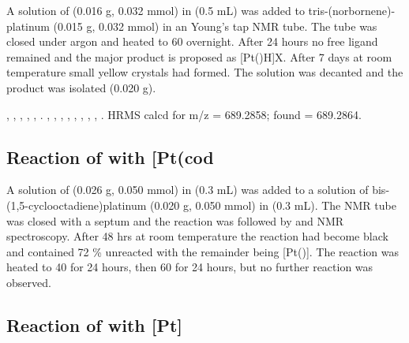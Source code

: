 
A solution of \tBuxantphos{} (0.016 g, 0.032 mmol) in  (0.5 mL) was added to tris-(norbornene)-platinum (0.015 g, 0.032 mmol) in an Young's tap NMR tube.  The tube was closed under argon and heated to 60 \degC{} overnight.  After 24 hours no free ligand remained and the major product is proposed as [Pt(\tBuxantphosk)H]X.  After 7 days at room temperature small yellow crystals had formed.  The solution was decanted and the product was isolated (0.020 g).  

,
,
,
,
,
.
,
,
,
,
,
,
,
,
.
HRMS calcd for  m/z = 689.2858; found = 689.2864.

\subsection*{Reaction of \tButhixantphos{} with \texorpdfstring{[Pt(cod\ce{)2]}} P}

A solution of \tButhixantphos{} (0.026 g, 0.050 mmol) in  (0.3 mL) was added to a solution of bis-(1,5-cyclooctadiene)platinum (0.020 g, 0.050 mmol) in  (0.3 mL).  The NMR tube was closed with a septum and the reaction was followed by \proton{} and \phosphorus{} NMR spectroscopy.  After 48 hrs at room temperature the reaction had become black and contained 72 \% unreacted \tButhixantphos{} with the remainder being [Pt(\tButhixantphos)].  The reaction was heated to 40 \degC{} for 24 hours, then 60 \degC{} for 24 hours, but no further reaction was observed.  

\subsection*{Reaction of \tBusixantphos{} with \texorpdfstring{[Pt]} P}

